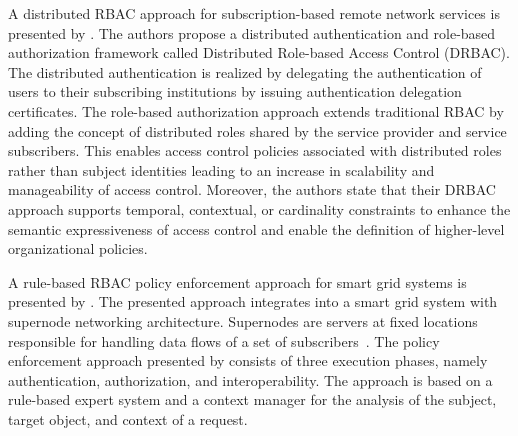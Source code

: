 A distributed RBAC approach for subscription-based remote network services is presented by \citeauthor{Ma2006} \cite{Ma2006a,Ma2006}.
The authors propose a distributed authentication and role-based authorization framework called Distributed Role-based Access Control (DRBAC).
The distributed authentication is realized by delegating the authentication of users to their subscribing institutions by issuing authentication delegation certificates.
The role-based authorization approach extends traditional RBAC by adding the concept of distributed roles shared by the service provider and service subscribers.
This enables access control policies associated with distributed roles rather than subject identities leading to an increase in scalability and manageability of access control.
Moreover, the authors state that their DRBAC approach supports temporal, contextual, or cardinality constraints to enhance the semantic expressiveness of access control and enable the definition of higher-level organizational policies.

A rule-based RBAC policy enforcement approach for smart grid systems is presented by \citeauthor{Alcaraz2016} \cite{Alcaraz2016}.
The presented approach integrates into a smart grid system with supernode networking architecture.
Supernodes are servers at fixed locations responsible for handling data flows of a set of subscribers~\cite{Samuel2008}.
The policy enforcement approach presented by \citeauthor{Alcaraz2016} consists of three execution phases, namely authentication, authorization, and interoperability.
The approach is based on a rule-based expert system and a context manager for the analysis of the subject, target object, and context of a request.
